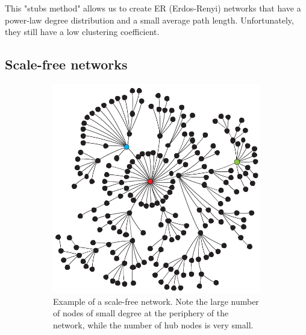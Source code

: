This "stubs method" allows us to create ER (Erdos-Renyi) networks that have a power-law
degree distribution and a small average path length. Unfortunately, they still
have a low clustering coefficient.

\subsection{Scale-free networks}

\begin{figure}
  \centering
  \begin{subfigure}[b]{0.4\textwidth}
    \includegraphics[width=\textwidth]{images/scale-free-network.png}
    \caption{Example of a scale-free network. Note the large
    number of nodes of small degree at the periphery of the network, while the
    number of hub nodes is very small.}
    \label{fig:scale_free_network}  
  \end{subfigure}
  ~ %
  \begin{subfigure}[b]{0.5\textwidth}
    \centering

\end{subfigure}
\end{figure}

